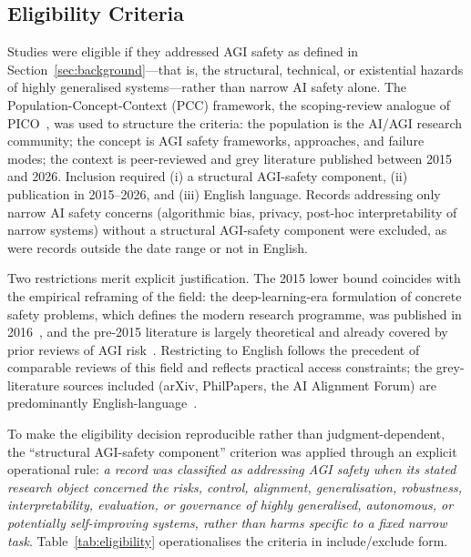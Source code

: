 \subsection{Eligibility Criteria}
Studies were eligible if they addressed AGI safety as defined in Section~\ref{sec:background}---that is, the structural, technical, or existential hazards of highly generalised systems---rather than narrow AI safety alone. The Population-Concept-Context (PCC) framework, the scoping-review analogue of PICO~\cite{arksey2005scoping,levac2010scoping}, was used to structure the criteria: the population is the AI/AGI research community; the concept is AGI safety frameworks, approaches, and failure modes; the context is peer-reviewed and grey literature published between 2015 and 2026. Inclusion required (i) a structural AGI-safety component, (ii) publication in 2015--2026, and (iii) English language. Records addressing only narrow AI safety concerns (algorithmic bias, privacy, post-hoc interpretability of narrow systems) without a structural AGI-safety component were excluded, as were records outside the date range or not in English.

Two restrictions merit explicit justification. The 2015 lower bound coincides with the empirical reframing of the field: the deep-learning-era formulation of concrete safety problems, which defines the modern research programme, was published in 2016~\cite{amodei2016concrete}, and the pre-2015 literature is largely theoretical and already covered by prior reviews of AGI risk~\cite{bostrom2014superintelligence,hendrycks2023overview}. Restricting to English follows the precedent of comparable reviews of this field and reflects practical access constraints; the grey-literature sources included (arXiv, PhilPapers, the AI Alignment Forum) are predominantly English-language~\cite{gyevnar2025aisafety}.

To make the eligibility decision reproducible rather than judgment-dependent, the ``structural AGI-safety component'' criterion was applied through an explicit operational rule: \emph{a record was classified as addressing AGI safety when its stated research object concerned the risks, control, alignment, generalisation, robustness, interpretability, evaluation, or governance of highly generalised, autonomous, or potentially self-improving systems, rather than harms specific to a fixed narrow task}. Table~\ref{tab:eligibility} operationalises the criteria in include/exclude form.

